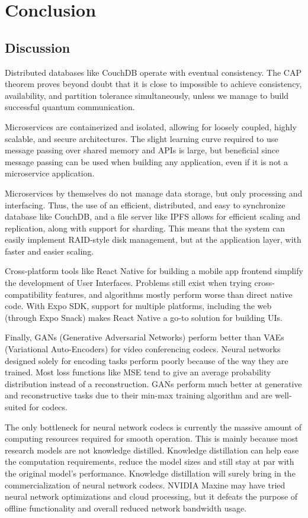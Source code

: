 \chapter{\centering Conclusion}

\section{Discussion}
Distributed databases like CouchDB operate with eventual consistency. The CAP theorem proves beyond doubt that it is close to impossible 
to achieve consistency, availability, and partition tolerance simultaneously, unless we manage to build successful quantum communication.

Microservices are containerized and isolated, allowing for loosely coupled, highly scalable, and secure architectures. The slight learning curve required 
to use message passing over shared memory and APIs is large, but beneficial since message passing can be used when building any application, even if it is 
not a microservice application.

Microservices by themselves do not manage data storage, but only processing and interfacing. Thus, the use of an efficient, distributed, and easy to synchronize database like CouchDB, and a file server like IPFS allows for efficient scaling and replication, along with support for sharding. This means that the system can 
easily implement RAID-style disk management, but at the application layer, with faster and easier scaling.

Cross-platform tools like React Native for building a mobile app frontend simplify the development of User Interfaces. Problems still exist when trying cross-compatibility features, and algorithms mostly perform worse than direct native code. With Expo SDK, support for multiple platforms, including 
the web (through Expo Snack) makes React Native a go-to solution for building UIs.

Finally, GANs (Generative Adversarial Networks) perform better than VAEs (Variational Auto-Encoders) for video conferencing codecs. 
Neural networks designed solely for encoding tasks perform poorly because of the way they are trained. Most loss functions like MSE tend to give an average probability distribution instead of a reconstruction. GANs perform much better at generative and reconstructive tasks due to their min-max training algorithm and are well-suited for codecs.

The only bottleneck for neural network codecs is currently the massive amount of computing resources required for smooth operation. This is mainly because most research models are not knowledge distilled. Knowledge distillation can help ease the computation requirements, reduce the model sizes and still stay at par with the original model's performance. Knowledge distillation will surely bring in the commercialization of neural network codecs. NVIDIA Maxine may have tried neural 
network optimizations and cloud processing, but it defeats the purpose of offline functionality and overall reduced network bandwidth usage.

